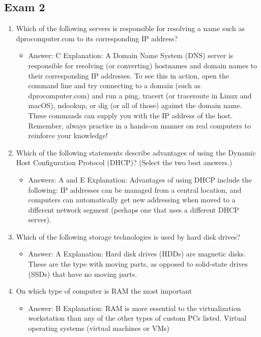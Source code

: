 \documentclass{article}
\begin{document}
\subsection{Exam 2} 
\begin{enumerate}
    \item Which of the following servers is responsible for resolving a name
such as dprocomputer.com to its corresponding IP address?
    \begin{itemize}
        \item Answer: C
Explanation: A Domain Name System (DNS) server is responsible for resolving (or
converting) hostnames and domain names to their corresponding IP addresses. To
see this in action, open the command line and try connecting to a domain (such
as dprocomputer.com) and run a ping, tracert (or traceroute in Linux and macOS),
nslookup, or dig (or all of those) against the domain name. These commands can
supply you with the IP address of the host. Remember, always practice in a hands-on
manner on real computers to reinforce your knowledge!
    \end{itemize}
     \item Which of the following statements describe advantages of using
the Dynamic Host Configuration Protocol (DHCP)? (Select the two
best answers.)
    \begin{itemize}
        \item Answers: A and E
Explanation: Advantages of using DHCP include the following: IP addresses can be
managed from a central location, and computers can automatically get new addressing
when moved to a different network segment (perhaps one that uses a different DHCP
server).
    \end{itemize}
     \item Which of the following storage technologies is used by hard
disk drives?
    \begin{itemize}
        \item Answer: A
Explanation: Hard disk drives (HDDs) are magnetic disks. These are the type with
moving parts, as opposed to solid-state drives (SSDs) that have no moving parts.
    \end{itemize}
     \item On which type of computer is RAM the most important
    \begin{itemize}
        \item Answer: B
Explanation: RAM is more essential to the virtualization workstation than any of the
other types of custom PCs listed. Virtual operating systems (virtual machines or VMs)

\end{itemize}
\end{enumerate}
\end{document}
